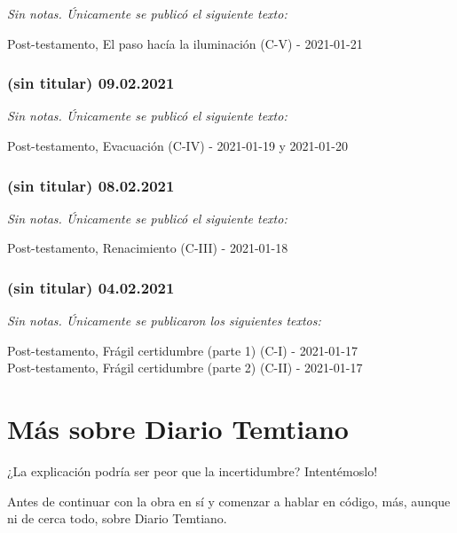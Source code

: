 \documentclass[
]{book}
\begin{document}
\emph{Sin notas. Únicamente se publicó el siguiente texto:}

Post-testamento, El paso hacía la iluminación (C-V) - 2021-01-21

\hypertarget{sin-titular-09.02.2021}{%
\subsection*{(sin titular) 09.02.2021}\label{sin-titular-09.02.2021}}

\emph{Sin notas. Únicamente se publicó el siguiente texto:}

Post-testamento, Evacuación (C-IV) - 2021-01-19 y 2021-01-20

\hypertarget{sin-titular-08.02.2021}{%
\subsection*{(sin titular) 08.02.2021}\label{sin-titular-08.02.2021}}

\emph{Sin notas. Únicamente se publicó el siguiente texto:}

Post-testamento, Renacimiento (C-III) - 2021-01-18

\hypertarget{sin-titular-04.02.2021}{%
\subsection*{(sin titular) 04.02.2021}\label{sin-titular-04.02.2021}}

\emph{Sin notas. Únicamente se publicaron los siguientes textos:}

Post-testamento, Frágil certidumbre (parte 1) (C-I) - 2021-01-17~\\
Post-testamento, Frágil certidumbre (parte 2) (C-II) - 2021-01-17

\hypertarget{muxe1s-sobre-diario-temtiano}{%
\chapter*{Más sobre Diario Temtiano}\label{muxe1s-sobre-diario-temtiano}}

¿La explicación podría ser peor que la incertidumbre? Intentémoslo!

Antes de continuar con la obra en sí y comenzar a hablar en código, más, aunque ni de cerca todo, sobre Diario Temtiano.
\end{document}
